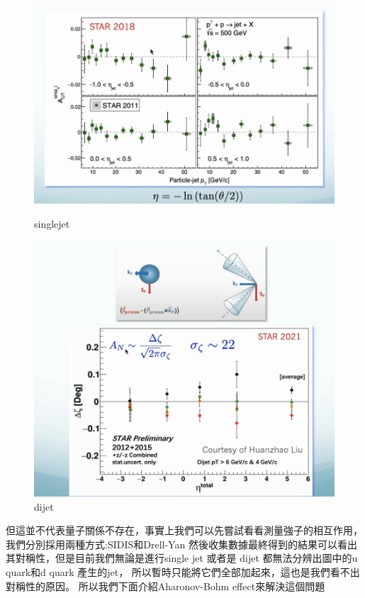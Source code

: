 \documentclass[12pt, a4paper, oneside]{ctexart}
\begin{document}
\begin{spacing}{2.0}
\begin{figure}
    \begin{minipage}[t]{0.5\linewidth}
        \centering
        \includegraphics[scale=0.3]{alpha.jpg}
        \caption{singlejet}
        \label{fig:side:a}
      \end{minipage}%
      \begin{minipage}[t]{0.5\linewidth}
        \centering
        \includegraphics[scale=0.3]{dijet.jpg}
        \caption{dijet}
        \label{fig:side:b}
      \end{minipage}
 
\end{figure}
但這並不代表量子關係不存在，事實上我們可以先嘗試看看測量強子的相互作用，我們分別採用兩種方式:SIDIS和Drell-Yan
然後收集數據最終得到的結果可以看出其對稱性，但是目前我們無論是進行single jet 或者是 dijet 都無法分辨出圖中的u quark和d quark 產生的jet，
所以暫時只能將它們全部加起來，這也是我們看不出對稱性的原因。
所以我們下面介紹Aharonov-Bohm effect來解決這個問題


\end{spacing}
\end{document}

